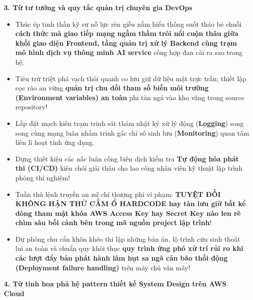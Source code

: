 \vspace{0.5em}\noindent\textbf{3. Từ tư tưởng và quy tắc quản trị chuyên gia
DevOps}\par

\begin{itemize}
\tightlist
\item
  Thúc ép tinh thần kỹ sư nỗ lực rèn giễu nắm hiểu thông suốt tháo bẻ
  chuỗi \textbf{cách thức mà giao tiếp mạng ngầm thầm trôi nổi cuộn thâu
  giữa khối giao diện Frontend, tầng quản trị xử lý Backend cùng trạm mô
  hình dịch vụ thông minh AI service} cống hợp đan cài ra sao trong hệ.
\item
  Tiêu trừ triệt phá vạch thói quanh co lưu giữ dữ liệu mật trực trần;
  thiết lập cọc rào an vững \textbf{quản trị chu dối tham số biến môi
  trường (Environment variables) an toàn} phi tàn ngả vào kho vãng trong
  source repository!
\item
  Lắp đặt mạch kiên trạm trinh sát thám nhật ký xử lý động
  (\textbf{Logging}) song song cùng mạng luân nhắm trinh gác chỉ số sinh
  lưu (\textbf{Monitoring}) quan tâm liên lỉ hoạt tính ứng dụng.
\item
  Dựng thiết kiệu các nấc luân cống biên dịch kiểm tra \textbf{Tự động
  hóa phát thi (CI/CD)} kiên chói giải thâu cho lao công nhân viên kỹ
  thuật lập trình phòng thí nghiệm!
\item
  Tuần thủ lệnh truyền an mĩ chí thượng phi vi phạm: \textbf{TUYỆT ĐỐI
  KHÔNG HẬN THỬ CẮM Ổ HARDCODE hay tàn lưu giữ bất kể dòng tham mật khóa
  AWS Access Key hay Secret Key nào len rẽ chìm sâu bối cảnh bên trong
  mã nguồn project lập trình}!
\item
  Dự phòng chu cẩn khôn khéo thi lập những bản án, lộ trình cứu sinh
  thoát lui an toàn và chuẩn quy khôi thục \textbf{quy trình ứng phó xử
  trí rủi ro khi các lượt đẩy bản phát hành lâm hụt sa ngã cản bão thối
  động (Deployment failure handling)} trên máy chủ vân mây!
\end{itemize}

\vspace{0.5em}\noindent\textbf{4. Từ tinh hoa phả hệ pattern thiết kế System Design trên
AWS
Cloud}\par

